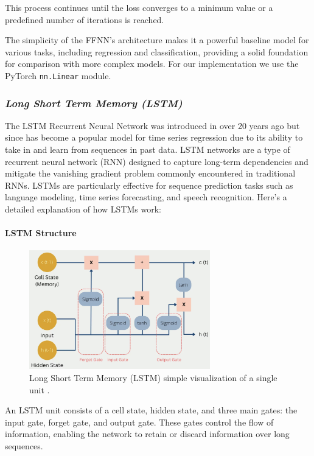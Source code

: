 \documentclass{article}
\begin{document}
    This process continues until the loss converges to a minimum value or a predefined number of iterations is reached.

    The simplicity of the FFNN's architecture makes it a powerful baseline model for various tasks, including regression and classification, providing a solid foundation for comparison with more complex models. For our implementation we use the PyTorch \texttt{nn.Linear} module.

\subsubsection{\emph{Long Short Term Memory (LSTM)}}
    The LSTM Recurrent Neural Network was introduced in \cite{hochreiter1997} over 20 years ago but since has become a popular model for time series regression due to its ability to take in and learn from sequences in past data. LSTM networks are a type of recurrent neural network (RNN) designed to capture long-term dependencies and mitigate the vanishing gradient problem commonly encountered in traditional RNNs. LSTMs are particularly effective for sequence prediction tasks such as language modeling, time series forecasting, and speech recognition. Here’s a detailed explanation of how LSTMs work:

    \paragraph{LSTM Structure}
    \begin{figure}[H]
        \centering
        \includegraphics[width=0.7\textwidth]{lstm.png}
        \caption{Long Short Term Memory (LSTM) simple visualization of a single unit \cite{lstm_structure}.}
        \label{fig:enter-label}
    \end{figure}

    An LSTM unit consists of a cell state, hidden state, and three main gates: the input gate, forget gate, and output gate. These gates control the flow of information, enabling the network to retain or discard information over long sequences.
\end{document}
